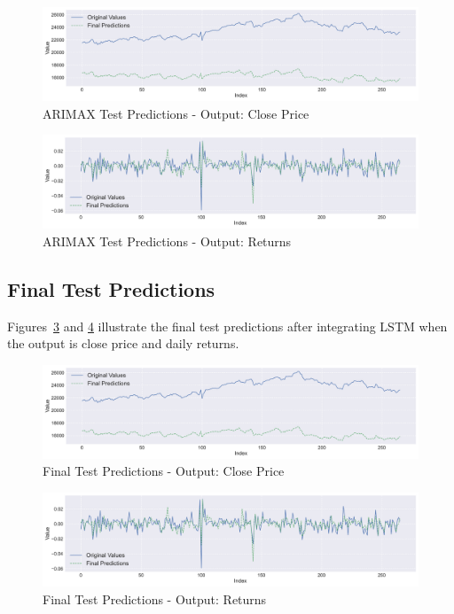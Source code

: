 \begin{figure}[h!]
    \centering
    \includegraphics[width=\textwidth]{Images/3_final_predictions_close.pdf}
    \caption{ARIMAX Test Predictions - Output: Close Price}
    \label{fig:arimax_close}
\end{figure}

\begin{figure}[h!]
    \centering
    \includegraphics[width=\textwidth]{Images/3_final_predictions_return.pdf}
    \caption{ARIMAX Test Predictions - Output: Returns}
    \label{fig:arimax_returns}
\end{figure}

\subsection{Final Test Predictions}
Figures~\ref{fig:final_close} and \ref{fig:final_returns} illustrate the final test predictions after integrating LSTM when the output is close price and daily returns.

\begin{figure}[h!]
    \centering
    \includegraphics[width=\textwidth]{Images/3_final_predictions_close.pdf}
    \caption{Final Test Predictions - Output: Close Price}
    \label{fig:final_close}
\end{figure}

\begin{figure}[h!]
    \centering
    \includegraphics[width=\textwidth]{Images/3_final_predictions_return.pdf}
    \caption{Final Test Predictions - Output: Returns}
    \label{fig:final_returns}
\end{figure}

